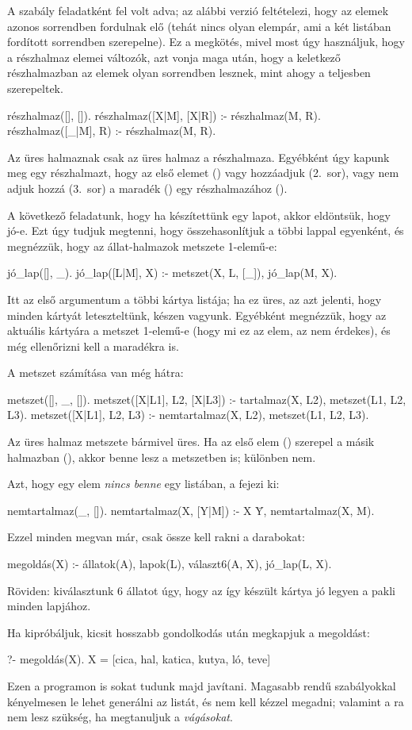 A  szabály feladatként fel volt adva;
az alábbi verzió feltételezi, hogy az elemek azonos
sorrendben fordulnak elő (tehát nincs olyan elempár,
ami a két listában fordított sorrendben
szerepelne). Ez a megkötés, mivel most úgy
használjuk, hogy a részhalmaz elemei változók, azt
vonja maga után, hogy a keletkező részhalmazban az
elemek olyan sorrendben lesznek, mint ahogy a
teljesben szerepeltek.
\begin{program}
részhalmaz([], []).
részhalmaz([X|M], [X|R]) :- részhalmaz(M, R).
részhalmaz([_|M], R) :- részhalmaz(M, R).
\end{program}
Az üres halmaznak csak az üres halmaz a
részhalmaza. Egyébként úgy kapunk meg egy
részhalmazt, hogy az első elemet () vagy
hozzáadjuk (2.~sor), vagy nem adjuk hozzá (3.~sor) a
maradék () egy részhalmazához ().

A következő feladatunk, hogy ha készítettünk egy
lapot, akkor eldöntsük, hogy jó-e. Ezt úgy tudjuk
megtenni, hogy összehasonlítjuk a többi lappal
egyenként, és megnézzük, hogy az állat-halmazok
metszete 1-elemű-e:
\begin{program}
jó_lap([], _).
jó_lap([L|M], X) :- metszet(X, L, [_]), jó_lap(M, X).
\end{program}
Itt az első argumentum a többi kártya listája; ha ez
üres, az azt jelenti, hogy minden kártyát
leteszteltünk, készen vagyunk. Egyébként megnézzük,
hogy az aktuális kártyára a metszet 1-elemű-e (hogy
mi ez az elem, az nem érdekes), és még ellenőrizni
kell a maradékra is.

A metszet számítása van még hátra:
\begin{program}
metszet([], _, []).
metszet([X|L1], L2, [X|L3]) :-
    tartalmaz(X, L2), metszet(L1, L2, L3).
metszet([X|L1], L2, L3) :-
    nemtartalmaz(X, L2), metszet(L1, L2, L3).
\end{program}
Az üres halmaz metszete bármivel üres. Ha az első
elem () szerepel a másik halmazban (),
akkor benne lesz a metszetben is; különben nem.

Azt, hogy egy elem \emph{nincs benne} egy listában,
a  fejezi ki:
\begin{program}
nemtartalmaz(_, []).
nemtartalmaz(X, [Y|M]) :- X \= Y, nemtartalmaz(X, M).
\end{program}

Ezzel minden megvan már, csak össze kell rakni a
darabokat:
\begin{program}
megoldás(X) :-
    állatok(A), lapok(L),
    választ6(A, X), jó_lap(L, X).
\end{program}
Röviden: kiválasztunk 6 állatot úgy, hogy az így
készült kártya jó legyen a pakli minden lapjához.

Ha kipróbáljuk, kicsit hosszabb gondolkodás után
megkapjuk a megoldást:
\begin{query}
?- megoldás(X).
X = [cica, hal, katica, kutya, ló, teve]
\end{query}

Ezen a programon is sokat tudunk majd
javítani. Magasabb rendű szabályokkal kényelmesen le
lehet generálni az  listát, és nem kell
kézzel megadni; valamint a ra nem
lesz szükség, ha megtanuljuk a \emph{vágásokat}.
